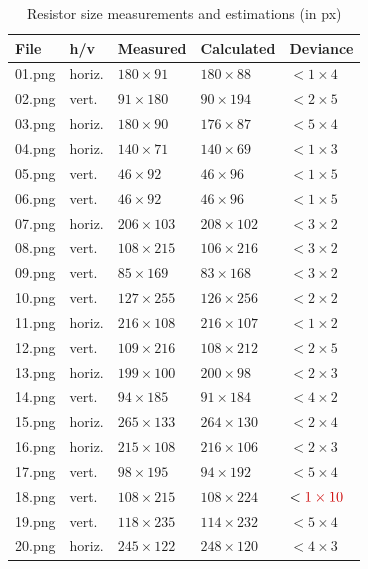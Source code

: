 \documentclass[10pt,twocolumn,letterpaper]{article}
\begin{document}
\begin{table}[H]
\centering
\begin{tabular}{l|l|l|l|l} \hline
		File & h/v & Measured & Calculated & Deviance\\ \hline \hline
		01.png & horiz. & $180\times91$ & $180\times88$ & $<1\times4$ \\ \hline
		02.png & vert. & $91\times180$ & $90\times194$ & $<2\times5$ \\ \hline
		03.png & horiz. & $180\times90$ & $176\times87$ & $<5\times4$ \\ \hline
		04.png & horiz. & $140\times71$ & $140\times69$ & $<1\times3$ \\ \hline
		05.png & vert. & $46\times92$ & $46\times96$ & $<1\times5$ \\ \hline
		06.png & vert. & $46\times92$ & $46\times96$ & $<1\times5$ \\ \hline
		07.png & horiz. & $206\times103$ & $208\times102$ & $<3\times2$ \\ \hline
		08.png & vert. & $108\times215$ & $106\times216$ & $<3\times2$ \\ \hline
		09.png & vert. & $85\times169$ & $83\times168$ & $<3\times2$ \\ \hline
		10.png & vert. & $127\times255$ & $126\times256$ & $<2\times2$ \\ \hline
		11.png & horiz. & $216\times108$ & $216\times107$ & $<1\times2$ \\ \hline
		12.png & vert. & $109\times216$ & $108\times212$ & $<2\times5$ \\ \hline
		13.png & horiz. & $199\times100$ & $200\times98$ & $<2\times3$ \\ \hline
		14.png & vert. & $94\times185$ & $91\times184$ & $<4\times2$ \\ \hline
		15.png & horiz. & $265\times133$ & $264\times130$ & $<2\times4$ \\ \hline
		16.png & horiz. & $215\times108$ & $216\times106$ & $<2\times3$ \\ \hline
		17.png & vert. & $98\times195$ & $94\times192$ & $<5\times4$ \\ \hline
		18.png & vert. & $108\times215$ & $108\times224$ & $<\textcolor[rgb]{0.8,0,0}{1\times10}$ \\ \hline
		19.png & vert. & $118\times235$ & $114\times232$ & $<5\times4$ \\ \hline
		20.png & horiz. & $245\times122$ & $248\times120$ & $<4\times3$ \\ \hline
\end{tabular}
\caption{Resistor size measurements and estimations (in px)}
\label{tab:resdim}
\end{table}
\par
\end{document}
